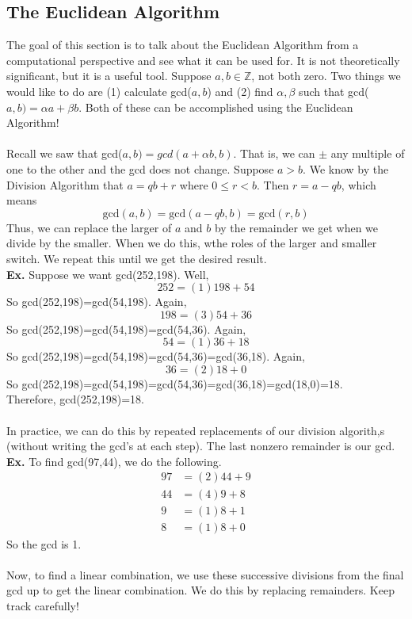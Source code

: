 \documentclass[class=article, crop=false]{standalone}
\def\integers{{\mathbb Z}}
\begin{document}
\subsection{The Euclidean Algorithm}
The goal of this section is to talk about the Euclidean Algorithm from a computational perspective and see what it can
be used for. It is not theoretically significant, but it is a useful tool. Suppose $a,b\in\integers$, not both
zero. Two things we would like to do are (1) calculate gcd($a,b$) and (2) find $\alpha, \beta$ such that 
gcd($a,b) = \alpha a+ \beta b$. Both of these can be accomplished using the Euclidean Algorithm!\\\\
Recall we saw that gcd($a,b)=gcd(a+\alpha b, b)$. That is, we can $\pm$ any multiple of one to the other
and the gcd does not change. Suppose $a>b$. We know by the Division Algorithm that $a=qb+r$ where $0\leq r<b$.
Then $r=a-qb$, which means $$\text{gcd}(a,b)=\text{gcd}(a-qb, b)=\text{gcd}(r,b)$$
Thus, we can replace the larger of $a$ and $b$ by the remainder we get when we divide by the smaller.
When we do this, wthe roles of the larger and smaller switch. We repeat this until we get the desired result.\\
\textbf{Ex.} Suppose we want gcd(252,198). Well, $$252=(1)198 + 54$$ So gcd(252,198)=gcd(54,198). Again,
$$198=(3)54 + 36$$ So gcd(252,198)=gcd(54,198)=gcd(54,36). Again,
$$54 = (1)36+18$$ So gcd(252,198)=gcd(54,198)=gcd(54,36)=gcd(36,18). Again,
$$36=(2)18+0$$ So gcd(252,198)=gcd(54,198)=gcd(54,36)=gcd(36,18)=gcd(18,0)=18.\\
Therefore, gcd(252,198)=18.\\\\
In practice, we can do this by repeated replacements of our division algorith,s (without writing the gcd's at
each step). The last nonzero remainder is our gcd.\\
\textbf{Ex.} To find gcd(97,44), we do the following.
\begin{align*}
	97 &= (2)44 +9\\
	44 &= (4)9 +8\\
	9 &= (1)8 +1\\
	8 &= (1)8 + 0
\end{align*}
So the gcd is 1.\\\\
Now, to find a linear combination, we use these successive divisions from the final gcd up to get the linear
combination. We do this by replacing remainders. Keep track carefully!\\
\end{document}
